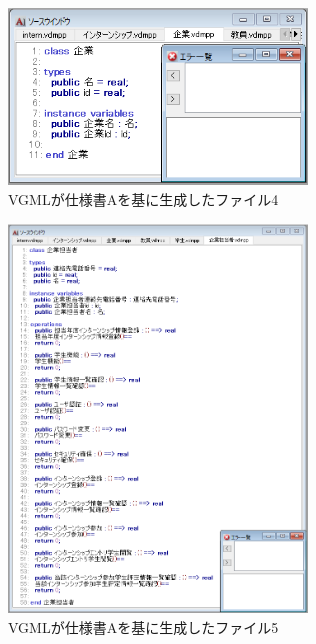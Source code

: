\begin{figure}[tp]
    \begin{center}
    \includegraphics[width=300]{image/indication_vdm4.PNG}
    \caption{VGMLが仕様書Aを基に生成したファイル4}
    \label{fig:indication_vdm4}
    \end{center}
\end{figure}

\begin{figure}[tp]
    \begin{center}
    \includegraphics[width=300]{image/indication_vdm5.PNG}
    \caption{VGMLが仕様書Aを基に生成したファイル5}
    \label{fig:indication_vdm5}
    \end{center}
\end{figure}

